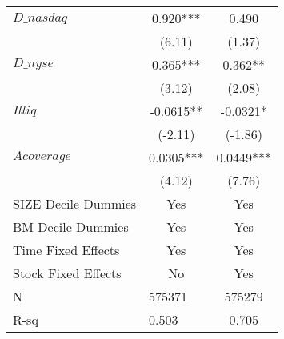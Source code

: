 \begin{tabular}{llc}
$D\_nasdaq$ & \multicolumn{1}{c}{0.920***} & 0.490 \\
        & \multicolumn{1}{c}{(6.11)} & (1.37) \\
$D\_nyse$ & \multicolumn{1}{c}{0.365***} & 0.362** \\
        & \multicolumn{1}{c}{(3.12)} & (2.08) \\
$Illiq$ & \multicolumn{1}{c}{-0.0615**} & -0.0321* \\
        & \multicolumn{1}{c}{(-2.11)} & (-1.86) \\
$Acoverage$ & \multicolumn{1}{c}{0.0305***} & 0.0449*** \\
        & \multicolumn{1}{c}{(4.12)} & (7.76) \\
\midrule
SIZE Decile Dummies & \multicolumn{1}{c}{Yes} & Yes \\
BM Decile Dummies & \multicolumn{1}{c}{Yes} & Yes \\
Time Fixed Effects & \multicolumn{1}{c}{Yes} & Yes \\
Stock Fixed Effects & \multicolumn{1}{c}{No} & Yes \\
N       & 575371  & 575279 \\
R-sq    & 0.503   & 0.705 \\
\bottomrule
\end{tabular}%
